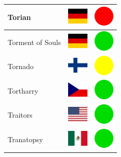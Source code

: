 \documentclass[12pt, a4paper, twoside]{report}
\begin{document}
\begin{center}
\begin{longtable}{|p{5cm}|p{2cm}|p{2cm}|}
Torian & \includegraphics[width=1cm]{4x3/de} & \includegraphics[width=1cm]{likes/n} \\ \hline
Torment of Souls & \includegraphics[width=1cm]{4x3/de} & \includegraphics[width=1cm]{likes/y} \\ \hline
Tornado & \includegraphics[width=1cm]{4x3/fi} & \includegraphics[width=1cm]{likes/m} \\ \hline
Tortharry & \includegraphics[width=1cm]{4x3/cz} & \includegraphics[width=1cm]{likes/y} \\ \hline
Traitors & \includegraphics[width=1cm]{4x3/us} & \includegraphics[width=1cm]{likes/y} \\ \hline
Tranatopsy & \includegraphics[width=1cm]{4x3/mx} & \includegraphics[width=1cm]{likes/y} \\ \hline

\end{longtable}
\end{center}
\end{document}
